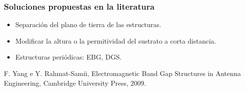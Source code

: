 \documentclass{beamer}
\begin{document}
		
		\begin{frame}
		\frametitle{Soluciones propuestas en la literatura}
		
		\begin{itemize}
			\item Separación del plano de tierra de las estructuras.
			\item Modificar la altura o la permitividad del sustrato a corta distancia.
			\item Estructuras periódicas: EBG, DGS.
		\end{itemize}
		
		\begin{figure}[H]
			\centering 
			\hspace{10pt}
		\end{figure}
		\tiny{F. Yang e Y. Rahmat-Samii, Electromagnetic Band Gap Structures in Antenna Engineering, Cambridge University Press, 2009.}
		\end{frame}
\end{document}
